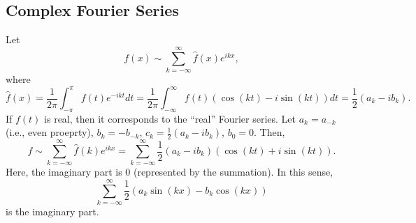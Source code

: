 \documentclass[letterpaper]{article}
\begin{document}
\subsection{Complex Fourier Series}
Let \[f(x) \sim \sum_{k = -\infty}^{\infty} \hat{f}(x) e^{ikx},\]
where \[\hat{f}(x) = \frac{1}{2\pi} \int_{-\pi}^{\pi} f(t) e^{-ikt} dt = \frac{1}{2\pi} \int_{-\infty}^{\infty} f(t) (\cos(kt) - i\sin(kt)) dt = \frac{1}{2}(a_k - i b_k).\]
If $f(t)$ is real, then it corresponds to the ``real'' Fourier series. Let $a_{k} = a_{-k}$ (i.e., even proeprty), $b_{k} = -b_{-k}$, $c_{k} = \frac{1}{2}(a_{k} - ib_{k})$, $b_{0} = 0$. Then, 
\[f \sim \sum_{k = -\infty}^{\infty} \hat{f}(k) e^{ikx} = \sum_{k = -\infty}^{\infty} \frac{1}{2} (a_{k} - ib_{k})(\cos(kt) + i\sin(kt)).\]
Here, the imaginary part is 0 (represented by the summation). In this sense, 
\[\sum_{k = -\infty}^{\infty} \frac{1}{2}(a_{k} \sin(kx) - b_{k}\cos(kx))\] is the imaginary part.
\end{document}

